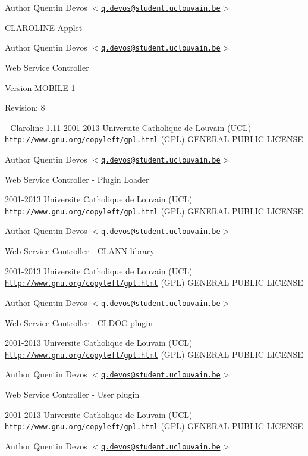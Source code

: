 \begin{DoxyAuthor}{Author}
Quentin Devos $<$\href{mailto:q.devos@student.uclouvain.be}{\tt q.devos@student.uclouvain.be}$>$
\end{DoxyAuthor}
CLAROLINE Applet

\begin{DoxyAuthor}{Author}
Quentin Devos $<$\href{mailto:q.devos@student.uclouvain.be}{\tt q.devos@student.uclouvain.be}$>$
\end{DoxyAuthor}
Web Service Controller

\begin{DoxyVersion}{Version}
\hyperlink{namespace_m_o_b_i_l_e}{MOBILE} 1 
\end{DoxyVersion}
\begin{DoxyParagraph}{Revision:}
8 
\end{DoxyParagraph}
-\/ Claroline 1.11  2001-\/2013 Universite Catholique de Louvain (UCL)  \href{http://www.gnu.org/copyleft/gpl.html}{\tt http://www.gnu.org/copyleft/gpl.html} (GPL) GENERAL PUBLIC LICENSE

\begin{DoxyAuthor}{Author}
Quentin Devos $<$\href{mailto:q.devos@student.uclouvain.be}{\tt q.devos@student.uclouvain.be}$>$
\end{DoxyAuthor}
Web Service Controller -\/ Plugin Loader

2001-\/2013 Universite Catholique de Louvain (UCL)  \href{http://www.gnu.org/copyleft/gpl.html}{\tt http://www.gnu.org/copyleft/gpl.html} (GPL) GENERAL PUBLIC LICENSE

\begin{DoxyAuthor}{Author}
Quentin Devos $<$\href{mailto:q.devos@student.uclouvain.be}{\tt q.devos@student.uclouvain.be}$>$
\end{DoxyAuthor}
Web Service Controller -\/ CLANN library

2001-\/2013 Universite Catholique de Louvain (UCL)  \href{http://www.gnu.org/copyleft/gpl.html}{\tt http://www.gnu.org/copyleft/gpl.html} (GPL) GENERAL PUBLIC LICENSE

\begin{DoxyAuthor}{Author}
Quentin Devos $<$\href{mailto:q.devos@student.uclouvain.be}{\tt q.devos@student.uclouvain.be}$>$
\end{DoxyAuthor}
Web Service Controller -\/ CLDOC plugin

2001-\/2013 Universite Catholique de Louvain (UCL)  \href{http://www.gnu.org/copyleft/gpl.html}{\tt http://www.gnu.org/copyleft/gpl.html} (GPL) GENERAL PUBLIC LICENSE

\begin{DoxyAuthor}{Author}
Quentin Devos $<$\href{mailto:q.devos@student.uclouvain.be}{\tt q.devos@student.uclouvain.be}$>$
\end{DoxyAuthor}
Web Service Controller -\/ User plugin

2001-\/2013 Universite Catholique de Louvain (UCL)  \href{http://www.gnu.org/copyleft/gpl.html}{\tt http://www.gnu.org/copyleft/gpl.html} (GPL) GENERAL PUBLIC LICENSE

\begin{DoxyAuthor}{Author}
Quentin Devos $<$\href{mailto:q.devos@student.uclouvain.be}{\tt q.devos@student.uclouvain.be}$>$ 
\end{DoxyAuthor}
